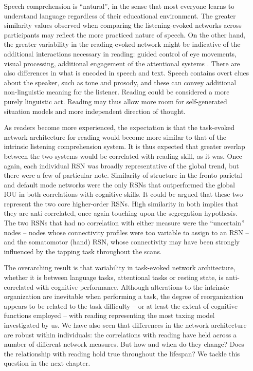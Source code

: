 Speech comprehension is ``natural'', in the sense that most everyone learns to understand language regardless of their educational environment. The greater similarity values observed when comparing the listening-evoked networks across participants may reflect the more practiced nature of speech. On the other hand, the greater variability in the reading-evoked network might be indicative of the additional interactions necessary in reading: guided control of eye movements, visual processing, additional engagement of the attentional systems \citep{Mattingly1971}. There are also differences in what is encoded in speech and text.  Speech contains overt clues about the speaker, such as tone and prosody, and these can convey additional non-linguistic meaning for the listener. Reading could be considered a more purely linguistic act. Reading may thus allow more room for self-generated situation models and more independent direction of thought. 

As readers become more experienced, the expectation is that the task-evoked network architecture for reading would become more similar to that of the intrinsic listening comprehension system. It is thus expected that greater overlap between the two systems would be correlated with reading skill, as it was. Once again, each individual RSN was broadly representative of the global trend, but there were a few of particular note. Similarity of structure in the fronto-parietal and default mode networks were the only RSNs that outperformed the global IOU in both correlations with cognitive skills. It could be argued that these two represent the two core higher-order RSNs. High similarity in both implies that they are anti-correlated, once again touching upon the segregation hypothesis. The two RSNs that had no correlation with either measure were the ``uncertain'' nodes -- nodes whose connectivity profiles were too variable to assign to an RSN -- and the somatomotor (hand) RSN, whose connectivity may have been strongly influenced by the tapping task throughout the scans. 

%
The overarching result is that variability in task-evoked network architecture, whether it is between language tasks, attentional tasks or resting state, is anti-correlated with cognitive performance. Although alterations to the intrinsic organization are inevitable when performing a task, the degree of reorganization appears to be related to the task difficulty -- or at least the extent of cognitive functions employed -- with reading representing the most taxing model investigated by us. We have also seen that differences in the network architecture are robust within individuals: the correlations with reading have held across a number of different network measures. But how and when do they change? Does the relationship with reading hold true throughout the lifespan? We tackle this question in the next chapter. 